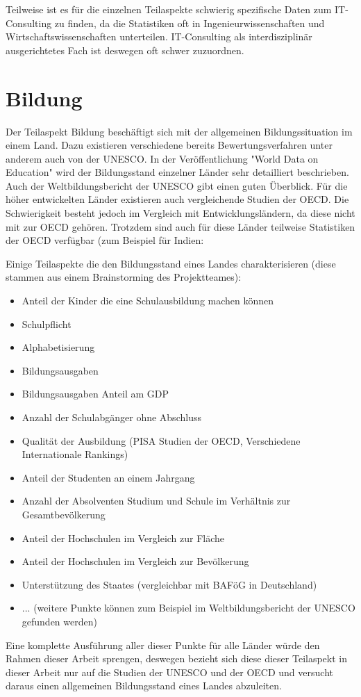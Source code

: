 Teilweise ist es für die einzelnen Teilaspekte schwierig spezifische Daten zum IT-Consulting zu finden, da die Statistiken oft in Ingenieurwissenschaften und Wirtschaftswissenschaften unterteilen. IT-Consulting als interdisziplinär ausgerichtetes Fach ist deswegen oft schwer zuzuordnen.

\section{Bildung}
Der Teilaspekt Bildung beschäftigt sich mit der allgemeinen Bildungssituation im einem Land. Dazu existieren verschiedene bereits Bewertungsverfahren unter anderem auch von der UNESCO. In der Veröffentlichung "World Data on Education" \cite{unesco2} wird der Bildungsstand einzelner Länder sehr detailliert beschrieben. Auch der Weltbildungsbericht der UNESCO \cite{unesco1} gibt einen guten Überblick. 
Für die höher entwickelten Länder existieren auch vergleichende Studien der OECD. Die Schwierigkeit besteht jedoch im Vergleich mit Entwicklungsländern, da diese nicht mit zur OECD gehören. Trotzdem sind auch für diese Länder teilweise Statistiken der OECD verfügbar (zum Beispiel für Indien: \cite{oecd}

Einige Teilaspekte die den Bildungsstand eines Landes charakterisieren (diese stammen aus einem Brainstorming des Projektteames):
\begin{itemize} 
\item Anteil der Kinder die eine Schulausbildung machen können
\item Schulpflicht
\item Alphabetisierung
\item Bildungsausgaben
\item Bildungsausgaben Anteil am GDP
\item Anzahl der Schulabgänger ohne Abschluss
\item Qualität der Ausbildung (PISA Studien der OECD, Verschiedene Internationale Rankings)
\item Anteil der Studenten an einem Jahrgang
\item Anzahl der Absolventen Studium und Schule im Verhältnis zur Gesamtbevölkerung
\item Anteil der Hochschulen im Vergleich zur Fläche
\item Anteil der Hochschulen im Vergleich zur Bevölkerung
\item Unterstützung des Staates (vergleichbar mit BAFöG in Deutschland)
\item ... (weitere Punkte können zum Beispiel im Weltbildungsbericht der UNESCO gefunden werden)
\end{itemize}
Eine komplette Ausführung aller dieser Punkte für alle Länder würde den Rahmen dieser Arbeit sprengen, deswegen bezieht sich diese
dieser Teilaspekt in dieser Arbeit nur auf die Studien der UNESCO und der OECD und versucht daraus einen allgemeinen Bildungsstand eines Landes abzuleiten.

